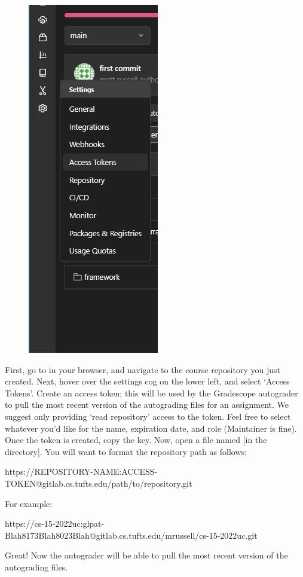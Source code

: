 \documentclass[11pt]{report}
\begin{document}
\begin{figure}
\includegraphics[scale=0.75]{access_token.png}
\end{figure}
First, go to  in your browser, and navigate to the course repository you just created.
Next, hover over the settings cog on the lower left, and select `Access Tokens'.
Create an access token; this will be used by the Gradescope autograder to pull the most recent version 
of the autograding files for an assignment. We suggest only providing `read repository' access to the token. Feel free 
to select whatever you'd like for the name, expiration date, and role (Maintainer is fine). Once the 
token is created, copy the key. Now, open a file named  [in the  directory].
You will want to format the repository path as follows: 
\\
\begin{bashcodeblock}
https://REPOSITORY-NAME:ACCESS-TOKEN@gitlab.cs.tufts.edu/path/to/repository.git
\end{bashcodeblock}
For example:
\begin{bashcodeblock}
https://cs-15-2022uc:glpat-Blah8173Blah8023Blah@gitlab.cs.tufts.edu/mrussell/cs-15-2022uc.git
\end{bashcodeblock}
Great! Now the autograder will be able to pull the most recent version of the autograding files.
\end{document}
